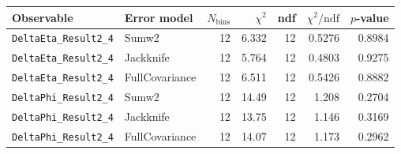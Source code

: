 \begin{tabular}{|l|l|r|r|r|r|r|}
\hline
Observable & Error model & $N_{\mathrm{bins}}$ & $\chi^2$ & ndf & $\chi^2/\mathrm{ndf}$ & $p$-value \\
\hline
\texttt{DeltaEta\_Result2\_4} & Sumw2 & 12 & 6.332 & 12 & 0.5276 & 0.8984 \\
\texttt{DeltaEta\_Result2\_4} & Jackknife & 12 & 5.764 & 12 & 0.4803 & 0.9275 \\
\texttt{DeltaEta\_Result2\_4} & FullCovariance & 12 & 6.511 & 12 & 0.5426 & 0.8882 \\
\texttt{DeltaPhi\_Result2\_4} & Sumw2 & 12 & 14.49 & 12 & 1.208 & 0.2704 \\
\texttt{DeltaPhi\_Result2\_4} & Jackknife & 12 & 13.75 & 12 & 1.146 & 0.3169 \\
\texttt{DeltaPhi\_Result2\_4} & FullCovariance & 12 & 14.07 & 12 & 1.173 & 0.2962 \\
\hline
\end{tabular}
